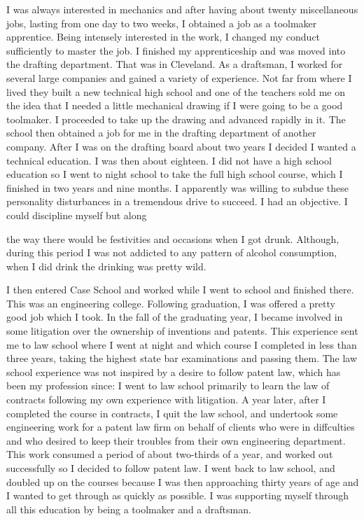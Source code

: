 \begin{biblechapter}
I was always interested in mechanics and after having about twenty miscellaneous jobs, lasting from one day to two weeks, I obtained a job as a toolmaker apprentice. Being intensely interested in the work, I changed my conduct sufficiently to master the job. I finished my apprenticeship and was moved into the drafting department. That was in Cleveland. As a draftsman, I worked for several large companies and gained a variety of experience. Not far from where I lived they built a new technical high school and one of the teachers sold me on the idea that I needed a little mechanical drawing if I were going to be a good toolmaker. I proceeded to take up the drawing and advanced rapidly in it. The school then obtained a job for me in the drafting department of another company. After I was on the drafting board about two years I decided I wanted a technical education. I was then about eighteen. I did not have a high school education so I went to night school to take the full high school course, which I finished in two years and nine months. I apparently was willing to subdue these personality disturbances in a tremendous drive to succeed. I had an objective. I could discipline myself but along

the way there would be festivities and occasions when I got drunk. Although, during this period I was not addicted to any pattern of alcohol consumption, when I did drink the drinking was pretty wild.

I then entered Case School and worked while I went to school and finished there. This was an engineering college. Following graduation, I was offered a pretty good job which I took. In the fall of the graduating year, I became involved in some litigation over the ownership of inventions and patents. This experience sent me to law school where I went at night and which course I completed in less than three years, taking the highest state bar examinations and passing them. The law school experience was not inspired by a desire to follow patent law, which has been my profession since: I went to law school primarily to learn the law of contracts following my own experience with litigation. A year later, after I completed the course in contracts, I quit the law school, and undertook some engineering work for a patent law firm on behalf of clients who were in diffculties and who desired to keep their troubles from their own engineering department. This work consumed a period of about two-thirds of a year, and worked out successfully so I decided to follow patent law. I went back to law school, and doubled up on the courses because I was then approaching thirty years of age and I wanted to get through as quickly as possible. I was supporting myself through all this education by being a toolmaker and a draftsman.


\end{biblechapter}

